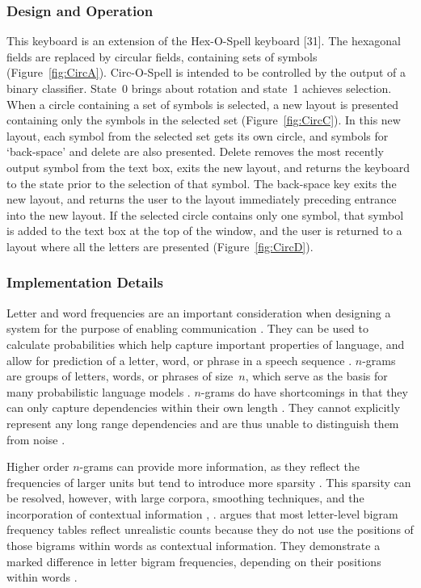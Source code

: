 \documentclass[12pt,titlepage]{article}
\begin{document}
\subsubsection{Design and Operation}

This keyboard is an extension of the Hex-O-Spell keyboard [31].  The hexagonal fields are replaced by 
circular fields, containing sets of symbols (Figure~\ref{fig:CircA}).  Circ-O-Spell is intended to be controlled by the 
output of a binary classifier.  State~0 brings about rotation and state~1 achieves selection.  When a circle 
containing a set of symbols is selected, a new layout is presented containing only the symbols in the 
selected set (Figure~\ref{fig:CircC}).  In this new layout, each symbol from the selected set gets its own circle, and 
symbols for `back-space' and delete are also presented.  Delete removes the most recently output 
symbol from the text box, exits the new layout, and returns the keyboard to the state prior to the 
selection of that symbol.  The back-space key exits the new layout, and returns the user to the layout 
immediately preceding entrance into the new layout.  If the selected circle contains only one symbol, 
that symbol is added to the text box at the top of the window, and the user is returned to a layout where 
all the letters are presented (Figure~\ref{fig:CircD}).

\subsubsection{Implementation Details}

Letter and word frequencies are an important consideration when designing a system for the purpose of 
enabling communication \cite{jones_case-sensitive_2004}.  They can be used to calculate probabilities which help capture important 
properties of language, and allow for prediction of a letter, word, or phrase in a speech sequence \cite{jones_case-sensitive_2004}.  $n$-grams are groups of letters, words, or phrases of size~$n$, which serve as the basis for many probabilistic 
language models \cite{reviewer-lee_review_2000}.  $n$-grams do have shortcomings in that they can only capture dependencies within 
their own length \cite{reviewer-lee_review_2000}.  They cannot explicitly represent any long range dependencies and are thus unable 
to distinguish them from noise \cite{reviewer-lee_review_2000}.

Higher order $n$-grams can provide more information, as they reflect the frequencies of larger units \cite{jones_case-sensitive_2004} 
but tend to introduce more sparsity \cite{_url.ppt_????}.  This sparsity can be resolved, however, with large corpora, 
smoothing techniques, and the incorporation of contextual information \cite{curran_very_2002}, \cite{russell_artificial_2002}.  \cite{rawlinson_bigram_1976} argues that most letter-level
bigram frequency tables reflect unrealistic counts because they do not use the positions of  those 
bigrams within words as contextual information.  They demonstrate a marked difference in letter 
bigram frequencies, depending on their positions within words \cite{rawlinson_bigram_1976}.
\end{document}
